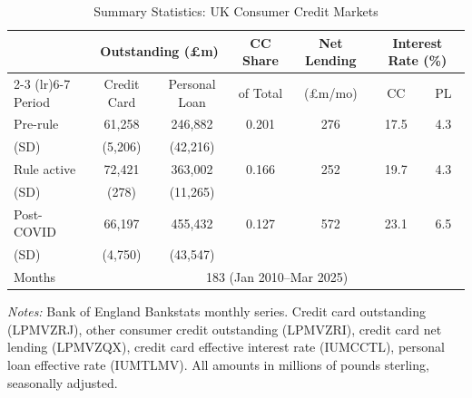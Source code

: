 \begin{table}[t]
\centering
\begin{threeparttable}
\caption{Summary Statistics: UK Consumer Credit Markets}
\label{tab:summary}
\footnotesize
\begin{tabular}{lcccccc}
\toprule
 & \multicolumn{2}{c}{Outstanding (\pounds m)} & CC Share & Net Lending & \multicolumn{2}{c}{Interest Rate (\%)} \\
\cmidrule(lr){2-3} \cmidrule(lr){6-7}
Period & Credit Card & Personal Loan & of Total & (\pounds m/mo) & CC & PL \\
\midrule
Pre-rule & 61,258 & 246,882 & 0.201 & 276 & 17.5 & 4.3 \\
\quad (SD) & (5,206) & (42,216) & & & & \\
Rule active & 72,421 & 363,002 & 0.166 & 252 & 19.7 & 4.3 \\
\quad (SD) & (278) & (11,265) & & & & \\
Post-COVID & 66,197 & 455,432 & 0.127 & 572 & 23.1 & 6.5 \\
\quad (SD) & (4,750) & (43,547) & & & & \\
\midrule
Months & \multicolumn{6}{c}{183 (Jan 2010--Mar 2025)} \\
\bottomrule
\end{tabular}
\begin{tablenotes}[flushleft]\small
\item \textit{Notes:} Bank of England Bankstats monthly series. Credit card outstanding (LPMVZRJ), other consumer credit outstanding (LPMVZRI), credit card net lending (LPMVZQX), credit card effective interest rate (IUMCCTL), personal loan effective rate (IUMTLMV). All amounts in millions of pounds sterling, seasonally adjusted.
\end{tablenotes}
\end{threeparttable}
\end{table}

